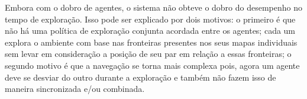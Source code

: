 Embora com o dobro de agentes, o sistema não obteve o dobro do 
desempenho no tempo de exploração. Isso pode ser explicado por dois motivos: o primeiro é que não há uma 
política de exploração conjunta acordada entre os agentes; cada um 
explora o ambiente com base nas fronteiras presentes nos seus mapas 
individuais sem levar em consideração a posição de seu par em relação 
a essas fronteiras; o segundo motivo é que a navegação se torna mais 
complexa pois, agora um agente deve se desviar do outro durante a 
exploração e também não fazem isso de maneira sincronizada e/ou combinada.




